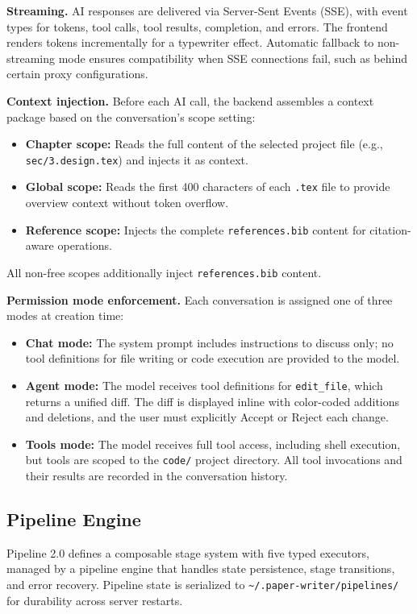 \textbf{Streaming.} AI responses are delivered via Server-Sent Events (SSE),
with event types for tokens, tool calls, tool results, completion, and errors.
The frontend renders tokens incrementally for a typewriter effect. Automatic
fallback to non-streaming mode ensures compatibility when SSE connections
fail, such as behind certain proxy configurations.

\textbf{Context injection.} Before each AI call, the backend assembles a
context package based on the conversation's scope setting:
\begin{itemize}
  \item \textbf{Chapter scope:} Reads the full content of the selected project
  file (e.g., \texttt{sec/3.design.tex}) and injects it as context.
  \item \textbf{Global scope:} Reads the first 400 characters of each
  \texttt{.tex} file to provide overview context without token overflow.
  \item \textbf{Reference scope:} Injects the complete \texttt{references.bib}
  content for citation-aware operations.
\end{itemize}
All non-free scopes additionally inject \texttt{references.bib} content.

\textbf{Permission mode enforcement.} Each conversation is assigned one of
three modes at creation time:
\begin{itemize}
  \item \textbf{Chat mode:} The system prompt includes instructions to discuss
  only; no tool definitions for file writing or code execution are provided to
  the model.
  \item \textbf{Agent mode:} The model receives tool definitions for
  \texttt{edit\_file}, which returns a unified diff. The diff is displayed
  inline with color-coded additions and deletions, and the user must
  explicitly Accept or Reject each change.
  \item \textbf{Tools mode:} The model receives full tool access, including
  shell execution, but tools are scoped to the \texttt{code/} project
  directory. All tool invocations and their results are recorded in the
  conversation history.
\end{itemize}

\subsection{Pipeline Engine}

Pipeline 2.0 defines a composable stage system with five typed executors,
managed by a pipeline engine that handles state persistence, stage transitions,
and error recovery. Pipeline state is serialized to
\texttt{\textasciitilde/.paper-writer/pipelines/} for durability across server
restarts.

